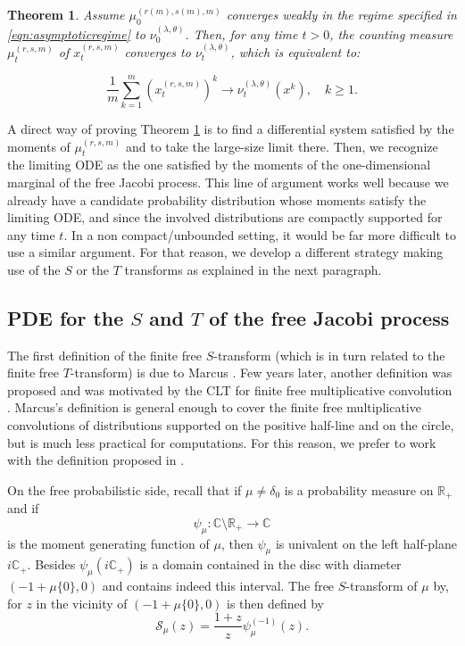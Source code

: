 \documentclass[12pt,reqno]{amsart}
\newtheorem{theorem}{Theorem}
\begin{document}
\begin{theorem}
\label{thm:maintheorem}
Assume $\mu_0^{(r(m),s(m),m)}$ converges weakly in the regime specified in \eqref{eqn:asymptoticregime} to $\nu_0^{(\lambda,\theta)}$. Then, for any time $t > 0$, the counting measure $\mu_t^{(r,s,m)}$ of $x^{(r,s,m)}_t$ converges to $\nu^{(\lambda,\theta)}_t$, which is equivalent to:

$$
\frac{1}{m} \sum_{k=1}^m (x_t^{(r,s,m)})^k \to \nu_t^{(\lambda,\theta)}(x^k),\quad k\geq 1.
$$
\end{theorem}

A direct way of proving Theorem \ref{thm:maintheorem} is to find a differential system satisfied by the moments of $\mu^{(r,s,m)}_t$ and to take the large-size limit there. Then, we recognize the limiting ODE as the one satisfied by the moments of the one-dimensional marginal of the free Jacobi process. This line of argument works well because we already have a candidate probability distribution whose moments satisfy the limiting ODE, and since the involved distributions are compactly supported for any time $t$. 
In a non compact/unbounded setting, it would be far more difficult to use a similar argument. For that reason, we develop a different strategy making use of the $S$ or the $T$ transforms as explained in the next paragraph. 

\subsection{PDE for the $S$ and $T$ of the free Jacobi process}
The first definition of the finite free $S$-transform (which is in turn related to the finite free $T$-transform) is due to Marcus \cite{MR4408504}. Few years later, another definition was proposed
and was motivated by the CLT for finite free multiplicative convolution \cite{arizmendi2024s}. Marcus's definition is general enough to cover the finite free multiplicative convolutions of distributions supported on the positive half-line and on the circle, but is much less practical for computations. For this reason, we prefer to work with the definition proposed in \cite{arizmendi2024s}.

On the free probabilistic side, recall that if $\mu \neq \delta_0$ is a probability measure on $\mathbb{R}_+$ and if  
\begin{equation*}
\psi_{\mu} \colon \mathbb{C}\setminus \mathbb{R}_+ \to \mathbb{C}    
\end{equation*} 
is the moment generating function of $\mu$, then $\psi_{\mu}$ is univalent on the left half-plane $i\mathbb{C}_+$. Besides $\psi_{\mu}(i\mathbb{C}_+)$ is a domain contained in the disc with diameter $(-1+\mu\{0\}, 0)$ and contains indeed this interval. The free $S$-transform of $\mu$ by, for $z$ in the vicinity of $(-1+\mu\{0\}, 0)$ is then defined by
$$
\mathcal{S}_{\mu}(z) = \frac{1+z}{z} \psi_{\mu}^{(-1)}(z).
$$
\end{document}
